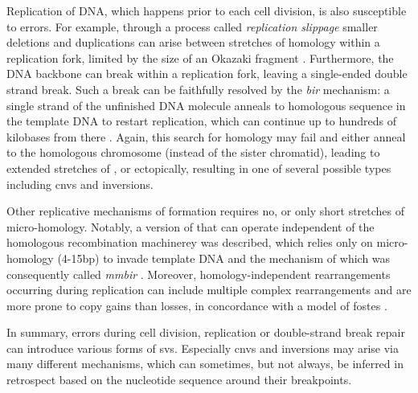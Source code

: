 Replication of DNA, which happens prior to each cell division, is also
susceptible to errors. For example, through a process called \textit{replication
slippage} smaller deletions and duplications can arise between stretches of
homology within a replication fork, limited by the size of an Okazaki fragment
\citep{Hastings2009}. Furthermore, the DNA backbone can break within a
replication fork, leaving a single-ended double strand break. Such a break can
be faithfully resolved by the \emph{\acf{bir}} mechanism: a single strand of the
unfinished DNA molecule anneals to homologous sequence in the template DNA to
restart replication, which can continue up to hundreds of kilobases from there
\citep{Carvalho2016}. Again, this search for homology may fail and either anneal
to the homologous chromosome (instead of the sister chromatid), leading to
extended stretches of \loh, or ectopically, resulting in one of several possible
\sv types including \acp{cnv} and inversions.

Other replicative mechanisms of \sv formation requires no, or only short
stretches of micro-homology. Notably, a version of \bir that can operate
independent of the homologous recombination machinerey was described, which
relies only on micro-homology (4-15bp) to invade template DNA and the mechanism
of which was consequently called \emph{\acf{mmbir}} \citep{Hastings2009a}.
Moreover, homology-independent rearrangements occurring during replication can
include multiple complex rearrangements and are more prone to copy gains than
losses, in concordance with a model of \acf{fostes} \citep{Zhang2009a,Hastings2009}.

In summary, errors during cell division, replication or double-strand break repair
can introduce various forms of \aclp{sv}. Especially \acp{cnv} and inversions may
arise via many different mechanisms, which can sometimes, but not always, be
inferred in retrospect based on the nucleotide sequence around their breakpoints.
